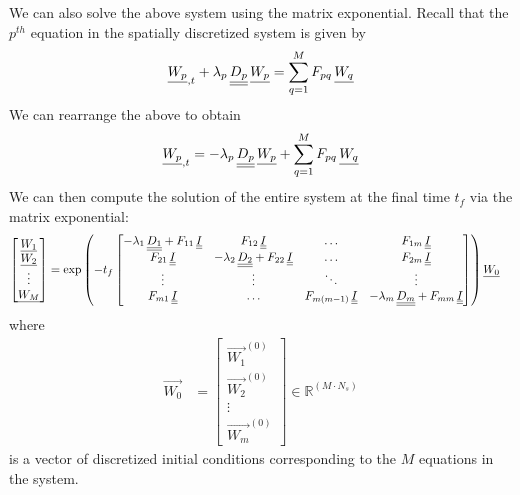 We can also solve the above system using the matrix exponential.
Recall that the $p^{th}$ equation in the spatially discretized system is given by
\begin{align}
    {\underline{W_{p}}}_{, t} + \lambda_{p} \, {\underline{\underline{D_{p}}}} \, {\underline{W_{p}}} = \sum_{q=1}^{M} F_{pq} \, {\underline{W_{q}}}
\end{align}
We can rearrange the above to obtain
\begin{align}
    {\underline{W_{p}}}_{, t} = -\lambda_{p} \, {\underline{\underline{D_{p}}}} \, {\underline{W_{p}}} + \sum_{q=1}^{M} F_{pq} \, {\underline{W_{q}}}
\end{align}
We can then compute the solution of the entire system at the final time $t_{f}$ via the matrix exponential:
\begin{align*}
    \begin{bmatrix}
        {\underline{W_{1}}} \\
        {\underline{W_{2}}} \\
        \vdots \\
        {\underline{W_{M}}}
    \end{bmatrix}
    & = \exp \left(-t_{f}
    \begin{bmatrix}
    -\lambda_{1} \, {\underline{\underline{D_{1}}}} + F_{11} \, {\underline{\underline{I}}} & F_{12} \, {\underline{\underline{I}}} & \hdots & F_{1m} \, {\underline{\underline{I}}}  \\
    F_{21} \, {\underline{\underline{I}}} & -\lambda_{2} \, {\underline{\underline{D_{2}}}} + F_{22} \, {\underline{\underline{I}}} & \hdots & F_{2m} \, {\underline{\underline{I}}}  \\
    \vdots & \vdots & \ddots & \vdots \\
    F_{m1} \, {\underline{\underline{I}}} & \hdots & F_{m(m-1)} \, {\underline{\underline{I}}} & -\lambda_{m} \, {\underline{\underline{D_{m}}}} + F_{mm} \, {\underline{\underline{I}}}
    \end{bmatrix} \right)
    {\underline{W_0}}
\end{align*}
where
\begin{align}
    \vec{W_{0}} & =
    \begin{bmatrix}
        \vec{W_{1}}^{(0)} \\
        \vec{W_{2}}^{(0)} \\
        \vdots \\
        \vec{W_{m}}^{(0)}
    \end{bmatrix} \in \mathbb{R}^{(M \cdot N_{s})}
\end{align}
is a vector of discretized initial conditions corresponding to the $M$ equations in the system.  